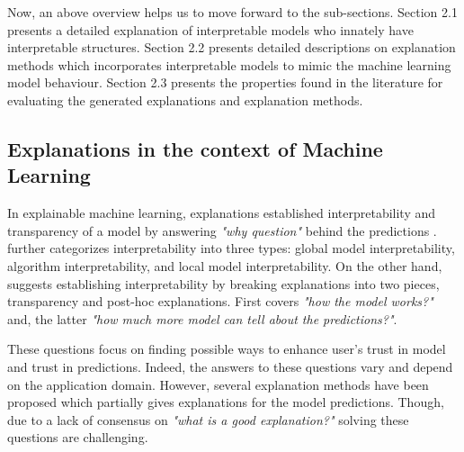 \documentclass[english]{tktltiki2}
\theoremstyle{definition}
\theoremstyle{remark}
\begin{document}
Now, an above overview helps us to move forward to the sub-sections. Section 2.1 presents a detailed explanation of interpretable models who innately have interpretable structures. Section 2.2 presents detailed descriptions on explanation methods which incorporates interpretable models to mimic the machine learning model behaviour. Section 2.3 presents the properties found in the literature for evaluating the generated explanations and explanation methods.



\subsection{Explanations in the context of Machine Learning} %
In explainable machine learning, explanations established interpretability and transparency of a model by answering {\itshape "why question" } behind the predictions \citep{honegger2018shedding}. \citet{honegger2018shedding} further categorizes interpretability into three types: global model interpretability, algorithm interpretability, and local model interpretability. On the other hand, \citet{lipton2016mythos} suggests establishing interpretability by breaking explanations into two pieces, transparency and post-hoc explanations. First covers {\itshape "how the model works?"} and, the latter {\itshape "how much more model can tell about the predictions?"}.

These questions focus on finding possible ways to enhance user's trust in model and trust in predictions. Indeed, the answers to these questions vary and depend on the application domain. However, several explanation methods have been proposed which partially gives explanations for the model predictions. Though, due to a lack of consensus on {\itshape "what is a good explanation?"} solving these questions are challenging.
\end{document}
